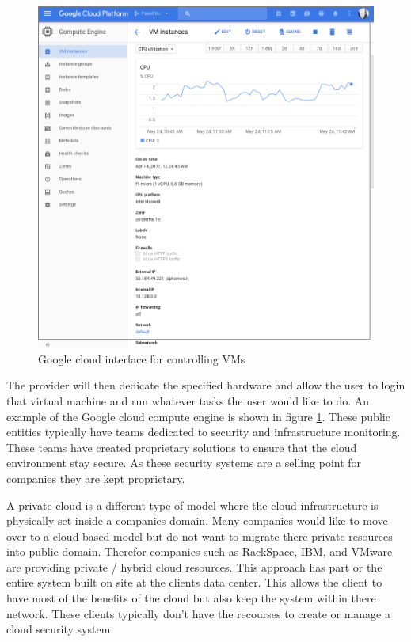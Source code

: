 \documentclass[12pt]{article}
\begin{document}
\begin{figure}[ht]
    \centering
    \includegraphics[scale=.2]{./pic/2017-05-24-114324_946x962_scrot.png}
    \caption{Google cloud interface for controlling VMs}
    \label{fig:GoogleInterface}
\end{figure}

The provider will then dedicate the specified hardware and allow the user to login that virtual machine and run whatever tasks the user would like to do. An example of the Google cloud compute engine is shown in figure \ref{fig:GoogleInterface}.  These public entities typically have teams dedicated to security and infrastructure monitoring. These teams have created proprietary solutions to ensure that the cloud environment \cite{SecAmazon} stay secure. As these security systems are a selling point for companies they are kept proprietary.

A private cloud is a different type of model where the cloud infrastructure is physically set inside a companies domain. Many companies would like to move over to a cloud based model but do not want to migrate there private resources into public domain. Therefor companies such as RackSpace, IBM, and VMware are providing private / hybrid cloud resources. This approach has part or the entire system built on site at the clients data center. This allows the client to have most of the benefits of the cloud but also keep the system within there network. These clients typically don't have the recourses to create or manage a cloud security system.
\end{document}
